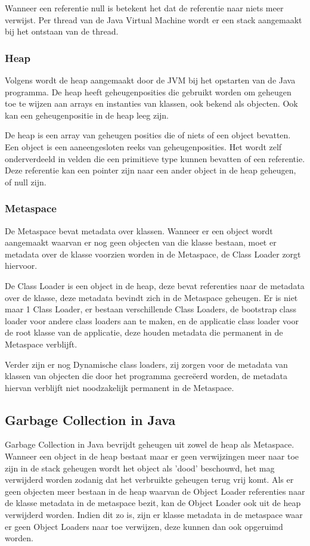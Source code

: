 Wanneer een referentie null is betekent het dat de referentie naar niets meer verwijst.
Per thread van de Java Virtual Machine wordt er een stack aangemaakt bij het ontstaan van de thread.
\autocite{Lindholm2013}

\subsubsection{Heap}
\label{sec:heap}
Volgens \textcite{Grgic2018} wordt de heap aangemaakt door de JVM bij het opstarten van de Java programma.
De heap heeft geheugenposities die gebruikt worden om geheugen toe te wijzen aan arrays en instanties van klassen, ook bekend als objecten.
Ook kan een geheugenpositie in de heap leeg zijn.

De heap is een array van geheugen posities die of niets of een object bevatten.
Een object is een aaneengesloten reeks van geheugenposities. Het wordt zelf onderverdeeld in velden die een primitieve type kunnen bevatten of een referentie.
Deze referentie kan een pointer zijn naar een ander object in de heap geheugen, of null zijn.\autocite{Bruno2018}
\subsubsection{Metaspace}
\label{sec:Metaspace}
De Metaspace bevat metadata over klassen.
Wanneer er een object wordt aangemaakt waarvan er nog geen objecten van die klasse bestaan, moet er metadata over de klasse voorzien worden in de Metaspace, de Class Loader zorgt hiervoor.

De Class Loader is een object in de heap, deze bevat referenties naar de metadata over de klasse, deze metadata bevindt zich in de Metaspace geheugen.
Er is niet maar 1 Class Loader, er bestaan verschillende Class Loaders, de bootstrap class loader voor andere class loaders aan te maken, en de applicatie class loader voor de root klasse van de applicatie, deze houden metadata die permanent in de Metaspace verblijft.

Verder zijn er nog Dynamische class loaders, zij zorgen voor de metadata van klassen van objecten die door het programma gecreëerd worden, de metadata hiervan verblijft niet noodzakelijk permanent in de Metaspace.
\autocite{Putten2022}
\subsection{Garbage Collection in Java}
\label{sec:garbage collection}
Garbage Collection in Java bevrijdt geheugen uit zowel de heap als Metaspace.
Wanneer een object in de heap bestaat maar er geen verwijzingen meer naar toe zijn in de stack geheugen wordt het object als 'dood' beschouwd, het mag verwijderd worden zodanig dat het verbruikte geheugen terug vrij komt.
Als er geen objecten meer bestaan in de heap waarvan de Object Loader referenties naar de klasse metadata in de metaspace bezit, kan de Object Loader ook uit de heap verwijderd worden.
Indien dit zo is, zijn er klasse metadata in de metaspace waar er geen Object Loaders naar toe verwijzen, deze kunnen dan ook opgeruimd worden. \autocite{Putten2022}

